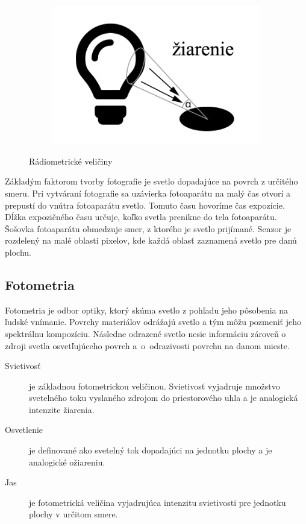 \begin{figure}[h!]
\begin{subfigure}{0.2\textwidth}
    \end{subfigure}
    ~
    \begin{subfigure}{0.2\textwidth}
        \includegraphics[width=\textwidth]{figures/light/radiance}
    \end{subfigure}
    \caption{Rádiometrické veličiny}
    \label{fig:radiometry}
\end{figure}

Základým faktorom tvorby fotografie je svetlo dopadajúce na povrch z určitého smeru.
Pri vytváraní fotografie sa uzávierka fotoaparátu na malý čas otvorí a prepustí do vnútra 
fotoaparátu svetlo. Tomuto času hovoríme čas expozície. Dĺžka expozičného času určuje,
koľko svetla prenikne do tela fotoaparátu.
Šošovka fotoaparátu obmedzuje smer, z ktorého je svetlo prijímané.
Senzor je rozdelený na malé oblasti pixelov, kde každá oblasť zaznamená svetlo pre danú plochu.

\subsection*{Fotometria}

Fotometria je odbor optiky, ktorý skúma svetlo z pohľadu jeho pôsobenia na ľudské vnímanie.
Povrchy materiálov odrážajú svetlo a tým môžu pozmeniť jeho spektrálnu kompozíciu.
Následne odrazené svetlo nesie informáciu zároveň o zdroji svetla osvetľujúceho
povrch a~o~odrazivosti povrchu na danom mieste.

\begin{description}
    \item [Svietivosť] je základnou fotometrickou veličinou. Svietivosť vyjadruje množstvo
    svetelného toku vyslaného zdrojom do priestorového uhla a je analogická intenzite žiarenia.
    \item [Osvetlenie] je definované ako svetelný tok dopadajúci na jednotku plochy a je analogické
    ožiareniu.
    \item [Jas] je fotometrická veličina vyjadrujúca intenzitu svietivosti pre jednotku plochy
    v určitom smere.
\end{description}

